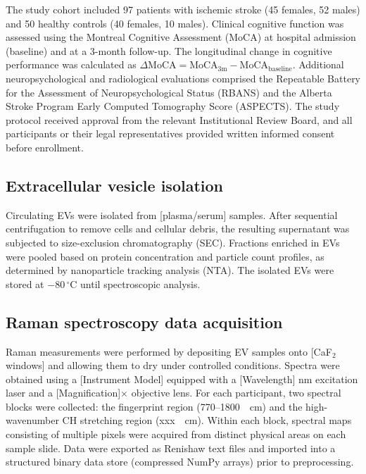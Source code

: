 \documentclass[preprint,12pt]{elsarticle}
\begin{document}
The study cohort included 97 patients with ischemic stroke (45 females, 52 males) and 50 healthy controls (40 females, 10 males). Clinical cognitive function was assessed using the Montreal Cognitive Assessment (MoCA) at hospital admission (baseline) and at a 3-month follow-up. The longitudinal change in cognitive performance was calculated as $\Delta\text{MoCA} = \text{MoCA}_{\text{3m}} - \text{MoCA}_{\text{baseline}}$. Additional neuropsychological and radiological evaluations comprised the Repeatable Battery for the Assessment of Neuropsychological Status (RBANS) and the Alberta Stroke Program Early Computed Tomography Score (ASPECTS). The study protocol received approval from the relevant Institutional Review Board, and all participants or their legal representatives provided written informed consent before enrollment.

\subsection{Extracellular vesicle isolation}
\label{subsec:ev_isolation}

Circulating EVs were isolated from [plasma/serum] samples. After sequential centrifugation to remove cells and cellular debris, the resulting supernatant was subjected to size-exclusion chromatography (SEC). Fractions enriched in EVs were pooled based on protein concentration and particle count profiles, as determined by nanoparticle tracking analysis (NTA). The isolated EVs were stored at $-80\,^{\circ}\mathrm{C}$ until spectroscopic analysis.

\subsection{Raman spectroscopy data acquisition}
\label{subsec:acquisition}

Raman measurements were performed by depositing EV samples onto [CaF$_2$ windows] and allowing them to dry under controlled conditions. Spectra were obtained using a [Instrument Model] equipped with a [Wavelength] nm excitation laser and a [Magnification]$\times$ objective lens. For each participant, two spectral blocks were collected: the fingerprint region (770–1800~\si{\per\centi\metre}) and the high-wavenumber C\textendash H stretching region (xxx~\si{\per\centi\metre}). Within each block, spectral maps consisting of multiple pixels were acquired from distinct physical areas on each sample slide. Data were exported as Renishaw\texttrademark{} text files and imported into a structured binary data store (compressed NumPy arrays) prior to preprocessing.
\end{document}
